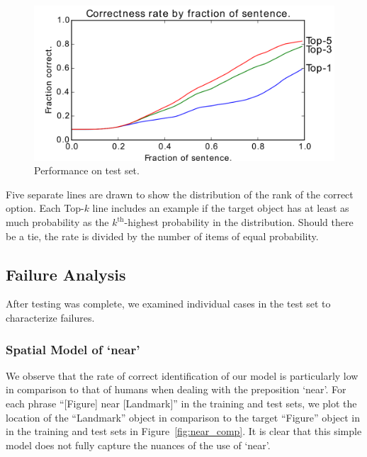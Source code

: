\documentclass[conference]{IEEEtran}
\numberwithin{equation}{section}
\begin{document}
\begin{figure}[h]
  \centering
  \includegraphics[width=\columnwidth]{eval/cdf_by_fraction}
  \caption{Performance on test set.}
  \label{fig:results_inc}
\end{figure}

Five separate lines are drawn to show the distribution of the rank of the correct option. Each Top-$k$ line includes an example if the target object has at least as much probability as the $k^\text{th}$-highest probability in the distribution. Should there be a tie, the rate is divided by the number of items of equal probability.

\subsection{Failure Analysis}
After testing was complete, we examined individual cases in the test set to characterize failures. 

\subsubsection{Spatial Model of `near'}

We observe that the rate of correct identification of our model is particularly low in comparison to that of humans when dealing with the preposition `near'. For each phrase ``[Figure] near [Landmark]'' in the training and test sets, we plot the location of the ``Landmark'' object in comparison to the target ``Figure'' object in in the training and test sets in Figure~\ref{fig:near_comp}. It is clear that this simple model does not fully capture the nuances of the use of `near'.
\end{document}
